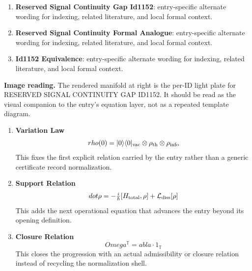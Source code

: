 \begin{enumerate}[leftmargin=1.6em,itemsep=6pt,topsep=4pt]
\item \textbf{Reserved Signal Continuity Gap Id1152}: entry-specific alternate wording for indexing, related literature, and local formal context.
\item \textbf{Reserved Signal Continuity Formal Analogue}: entry-specific alternate wording for indexing, related literature, and local formal context.
\item \textbf{Id1152 Equivalence}: entry-specific alternate wording for indexing, related literature, and local formal context.
\end{enumerate}

\begin{samepage}
\noindent\begin{minipage}[t]{0.45\linewidth}
\vspace{0pt}
\raggedright
\scriptsize\textbf{Image reading.} The rendered manifold at right is the per-ID light plate for RESERVED SIGNAL CONTINUITY GAP ID1152. It should be read as the visual companion to the entry's equation layer, not as a repeated template diagram.\par
\end{minipage}\hfill
\begin{minipage}[t]{0.53\linewidth}
\vspace*{-0.10in}
\raggedright
{}
\end{minipage}
\end{samepage}

\clearpage


\begin{enumerate}[leftmargin=1.6em,itemsep=9pt,topsep=6pt]
\item \textbf{Variation Law}
\[
rho(0)=|0\rangle\langle0|_{\rm vac}\otimes\rho_{\rm th}\otimes\rho_{\rm info}
\]
This fixes the first explicit relation carried by the entry rather than a generic certificate record normalization.

\item \textbf{Support Relation}
\[
dot\rho = -\tfrac{i}{\hbar}[H_{\rm total},\rho]+\mathcal L_{\rm diss}[\rho]
\]
This adds the next operational equation that advances the entry beyond its opening definition.

\item \textbf{Closure Relation}
\[
Omega^{\mathbb{T}}= abla\cdot1_{\mathbb{T}}
\]
This closes the progression with an actual admissibility or closure relation instead of recycling the normalization shell.
\end{enumerate}

